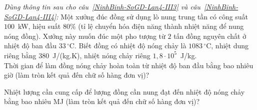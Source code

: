 	\begin{ex}%
		\label{NinhBinh-SoGD-Lan4-III3}\textit{Dùng thông tin sau cho câu~\ref{NinhBinh-SoGD-Lan4-III3} và câu~\ref{NinhBinh-SoGD-Lan4-III4}:} Một xưởng đúc đồng sử dụng lò nung trung tần có công suất $100$~kW, hiệu suất $80\%$ (tỉ lệ chuyển hóa điện năng thành nhiệt năng để nung nóng đồng). Xưởng này muốn đúc một pho tượng từ $2$ tấn đồng nguyên chất ở nhiệt độ ban đầu $33\,^\circ\text{C}$. Biết đồng có nhiệt độ nóng chảy là $1083\,^\circ\text{C}$, nhiệt dung riêng bằng $380$~J/(kg.K), nhiệt nóng chảy riêng $1{,}8\cdot 10^5$~J/kg.\\
		Thời gian để làm đồng nóng chảy hoàn toàn từ nhiệt độ ban đầu bằng bao nhiêu giờ (làm tròn kết quả đến chữ số hàng đơn vị)?
		\par
	\end{ex}

	\begin{ex}%
		\label{NinhBinh-SoGD-Lan4-III4}Nhiệt lượng cần cung cấp để lượng đồng cần nung đạt đến nhiệt độ nóng chảy bằng bao nhiêu MJ (làm tròn kết quả đến chữ số hàng đơn vị)?
		\par
	\end{ex}

